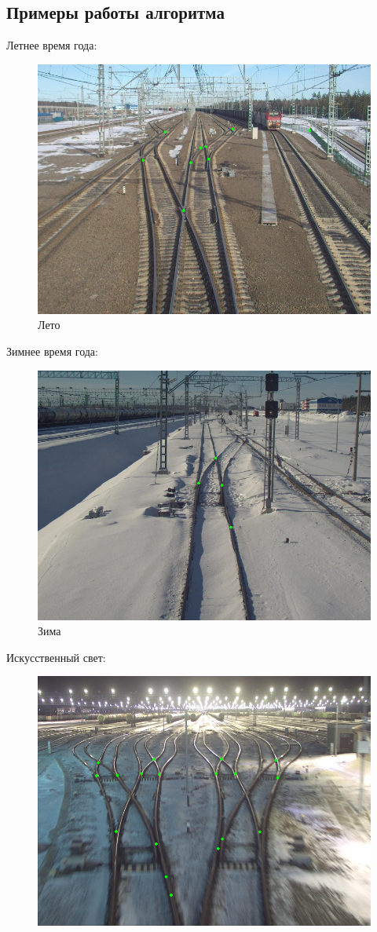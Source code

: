 \subsection{Примеры работы алгоритма}
Летнее время года:
\begin{figure}[!h]
	\centering
	\includegraphics[width=0.7\linewidth]{pictures/103.png}
	\caption[Лето]{Лето}
	\label{fig:103}
\end{figure}
\newpage
Зимнее время года:
\begin{figure}[!h]
	\centering
	\includegraphics[width=0.7\linewidth]{pictures/146.png}
	\caption[Зима]{Зима}
	\label{fig:105}
\end{figure}
\newline
Искусственный свет:
\begin{figure}[!h]
	\centering
	\includegraphics[width=0.7\linewidth]{pictures/isk.png}
	\caption[Искусственное освещение]{}
	\label{fig:isk}
\end{figure}

